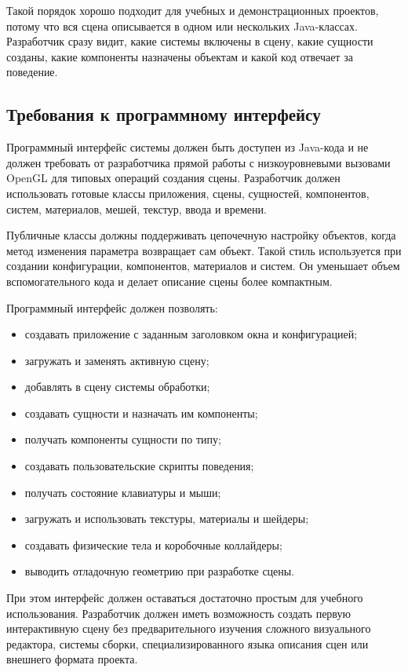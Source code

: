 Такой порядок хорошо подходит для учебных и демонстрационных проектов, потому что вся сцена описывается в одном или нескольких Java-классах. Разработчик сразу видит, какие системы включены в сцену, какие сущности созданы, какие компоненты назначены объектам и какой код отвечает за поведение.

\subsection{Требования к программному интерфейсу}

Программный интерфейс системы должен быть доступен из Java-кода и не должен требовать от разработчика прямой работы с низкоуровневыми вызовами OpenGL для типовых операций создания сцены. Разработчик должен использовать готовые классы приложения, сцены, сущностей, компонентов, систем, материалов, мешей, текстур, ввода и времени.

Публичные классы должны поддерживать цепочечную настройку объектов, когда метод изменения параметра возвращает сам объект. Такой стиль используется при создании конфигурации, компонентов, материалов и систем. Он уменьшает объем вспомогательного кода и делает описание сцены более компактным.

Программный интерфейс должен позволять:
\begin{itemize}
\item создавать приложение с заданным заголовком окна и конфигурацией;
\item загружать и заменять активную сцену;
\item добавлять в сцену системы обработки;
\item создавать сущности и назначать им компоненты;
\item получать компоненты сущности по типу;
\item создавать пользовательские скрипты поведения;
\item получать состояние клавиатуры и мыши;
\item загружать и использовать текстуры, материалы и шейдеры;
\item создавать физические тела и коробочные коллайдеры;
\item выводить отладочную геометрию при разработке сцены.
\end{itemize}

При этом интерфейс должен оставаться достаточно простым для учебного использования. Разработчик должен иметь возможность создать первую интерактивную сцену без предварительного изучения сложного визуального редактора, системы сборки, специализированного языка описания сцен или внешнего формата проекта.

